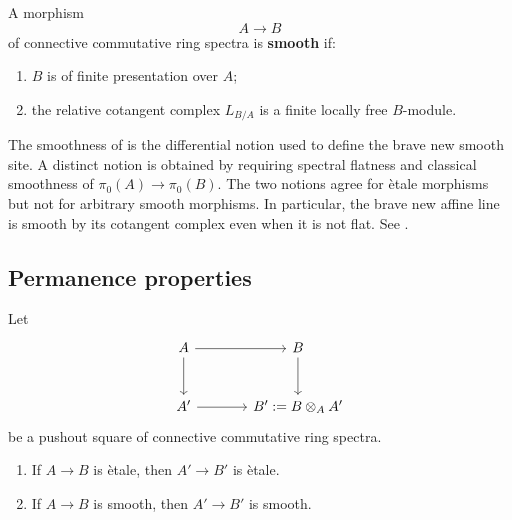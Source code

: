 \begin{definition}
\label{def:smooth-spectral-algebra}
A morphism
\[
    A
    \longrightarrow
    B
\]
of connective commutative ring spectra is \textbf{smooth} if:
\begin{enumerate}[label=(\roman*)]
    \item $B$ is of finite presentation over $A$;

    \item the relative cotangent complex $L_{B/A}$ is a finite locally
    free $B$-module.
\end{enumerate}
\end{definition}

\begin{remark}
\label{rem:differential-fibre-smoothness}
The smoothness of  is the differential
notion used to define the brave new smooth site. A distinct notion is
obtained by requiring spectral flatness and classical smoothness of
$\pi_0(A)\to\pi_0(B)$. The two notions agree for \`etale morphisms but not
for arbitrary smooth morphisms. In particular, the brave new affine line
is smooth by its cotangent complex even when it is not flat. See
\cite{KhanBraveNewMotivicI}.
\end{remark}

\subsection{Permanence properties}

\begin{proposition}
\label{prop:smooth-etale-base-change}
Let
\[
\begin{tikzcd}[column sep=large, row sep=large]
    A
        \arrow[r]
        \arrow[d]
    &
    B
        \arrow[d]
    \\
    A'
        \arrow[r]
    &
    B':=B\otimes_AA'
\end{tikzcd}
\]
be a pushout square of connective commutative ring spectra.
\begin{enumerate}[label=(\roman*)]
    \item If $A\to B$ is \`etale, then $A'\to B'$ is \`etale.

    \item If $A\to B$ is smooth, then $A'\to B'$ is smooth.
\end{enumerate}
\end{proposition}

